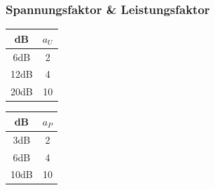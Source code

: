 \begin{frame}
  \frametitle{Spannungsfaktor \& Leistungsfaktor}
  \begin{center}
    \begin{Huge}
      \begin{minipage}{0.3\textwidth}
        \begin{tabular}{|c|c|}
          \hline
          \textbf{dB} & $a_{U}$ \\
          \hline \hline
          \alert{6dB}  & \alert{2}  \\ \hline
          12dB & 4  \\ \hline
          \alert{20dB} & \alert{10} \\ \hline
        \end{tabular}
      \end{minipage}
      \hspace{2cm}
      \begin{minipage}{0.3\textwidth}
        \begin{tabular}{|c|c|}
          \hline
          \textbf{dB} & $a_{P}$ \\
          \hline \hline
          \alert{3dB}  & \alert{2}  \\ \hline
          6dB  & 4  \\ \hline
          \alert{10dB} & \alert{10} \\ \hline
        \end{tabular}
      \end{minipage}
    \end{Huge}
  \end{center}
\end{frame}

